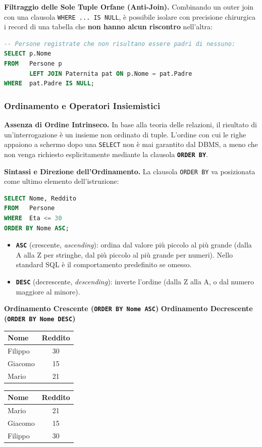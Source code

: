 \documentclass[12pt]{extarticle}
\begin{document}
\medskip
\noindent \textbf{Filtraggio delle Sole Tuple Orfane (Anti-Join).} Combinando un outer join con una clausola \texttt{WHERE ... IS NULL}, è possibile isolare con precisione chirurgica i record di una tabella che \textbf{non hanno alcun riscontro} nell'altra:
\begin{lstlisting}[language=SQL]
-- Persone registrate che non risultano essere padri di nessuno:
SELECT p.Nome
FROM   Persone p
       LEFT JOIN Paternita pat ON p.Nome = pat.Padre
WHERE  pat.Padre IS NULL;
\end{lstlisting}

\subsubsection{Ordinamento e Operatori Insiemistici}
\noindent \textbf{Assenza di Ordine Intrinseco.} In base alla teoria delle relazioni, il risultato di un'interrogazione è un insieme non ordinato di tuple. L'ordine con cui le righe appaiono a schermo dopo una \texttt{SELECT} non è mai garantito dal DBMS, a meno che non venga richiesto esplicitamente mediante la clausola \textbf{\texttt{ORDER BY}}.

\medskip
\noindent \textbf{Sintassi e Direzione dell'Ordinamento.} La clausola \texttt{ORDER BY} va posizionata come ultimo elemento dell'istruzione:
\begin{lstlisting}[language=SQL]
SELECT Nome, Reddito
FROM   Persone
WHERE  Eta <= 30
ORDER BY Nome ASC;
\end{lstlisting}
\begin{itemize}
    \item \textbf{\texttt{ASC}} (crescente, \textit{ascending}): ordina dal valore più piccolo al più grande (dalla A alla Z per stringhe, dal più piccolo al più grande per numeri). Nello standard SQL è il comportamento predefinito se omesso.
    \item \textbf{\texttt{DESC}} (decrescente, \textit{descending}): inverte l'ordine (dalla Z alla A, o dal numero maggiore al minore).
\end{itemize}

\begin{center}
\small
\textbf{Ordinamento Crescente (\texttt{ORDER BY Nome ASC})} \quad \textbf{Ordinamento Decrescente (\texttt{ORDER BY Nome DESC})} \\[1ex]
\begin{tabular}{lc}
    \toprule
    \textbf{Nome} & \textbf{Reddito} \\
    \midrule
    Filippo & 30 \\
    Giacomo & 15 \\
    Mario   & 21 \\
    \bottomrule
\end{tabular}
\qquad \qquad
\begin{tabular}{lc}
    \toprule
    \textbf{Nome} & \textbf{Reddito} \\
    \midrule
    Mario   & 21 \\
    Giacomo & 15 \\
    Filippo & 30 \\
    \bottomrule
\end{tabular}
\end{center}
\end{document}
